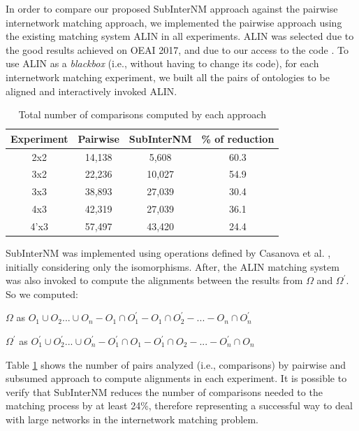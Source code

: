 \documentclass{llncs}
\begin{document}
In order to compare our proposed SubInterNM approach against the pairwise internetwork matching approach, we implemented the pairwise approach using the existing matching system ALIN \cite{da2017semantic} in all experiments. ALIN was selected due to the good results achieved on OEAI 2017, and due to our access to the code \cite{da2017alin}. To use ALIN as a \emph{blackbox} (i.e., without having to change its code), for each internetwork matching experiment, we built all the pairs of ontologies to be aligned and interactively invoked ALIN. 
\begin{table}[h!]
  \begin{center}
    \caption{Total number of comparisons computed by each approach}
    
    \label{tab:results}
    \begin{tabular}{c|c|c|c} 
      \textbf{Experiment} & \textbf{Pairwise} & \textbf{SubInterNM} & \textbf{\% of reduction} \\
      \hline
      2x2 & 14,138 & 5,608 & 60.3\\
      3x2 & 22,236 & 10,027 & 54.9\\
      3x3 & 38,893 & 27,039 & 30.4\\
      4x3 & 42,319 & 27,039 & 36.1\\
      4'x3 & 57,497 & 43,420 & 24.4
    \end{tabular}
  \end{center}
\end{table}
SubInterNM was implemented using operations defined by Casanova et al. \cite{casanova2012operations}, initially considering only the isomorphisms. After, the ALIN matching system\cite{da2017semantic} was also invoked to compute the alignments between the results from $\Omega$ and $\Omega^{'}$. So we computed: 

$\Omega $ as $ O_{1} \cup O_{2} ... \cup O_{n} - O_{1} \cap O^{'}_{1} - O_{1} \cap O^{'}_{2} - ... - O_{n} \cap O^{'}_{n}$  

$\Omega^{'} $ as $ O^{'}_{1} \cup O^{'}_{2} ... \cup O^{'}_{n} - O^{'}_{1} \cap O_{1} - O^{'}_{1} \cap O_{2} - ... - O^{'}_{n} \cap O_{n}$  

Table \ref{tab:results} shows the number of pairs analyzed (i.e., comparisons) by pairwise and subsumed approach to compute alignments in each experiment.
It is possible to verify that SubInterNM reduces the number of comparisons needed to the matching process by at least 24\%, therefore representing a successful way to deal with large networks in the internetwork matching problem. 
\end{document}
